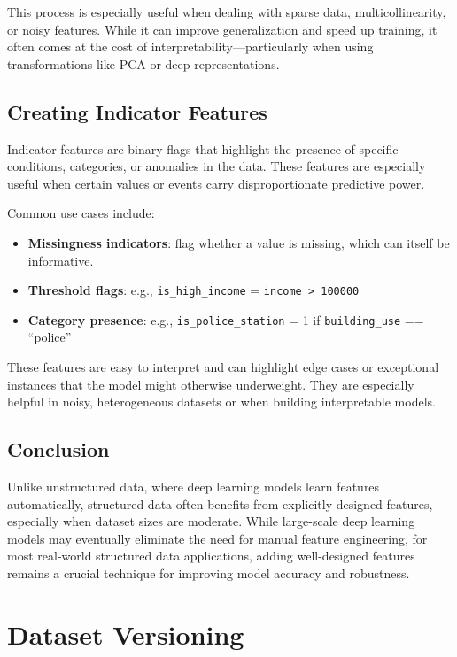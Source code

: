 \documentclass[12pt,openany]{book}
\begin{document}
This process is especially useful when dealing with sparse data, multicollinearity, or noisy features. While it can improve generalization and speed up training, it often comes at the cost of interpretability—particularly when using transformations like PCA or deep representations.



\section{Creating Indicator Features}

Indicator features are binary flags that highlight the presence of specific conditions, categories, or anomalies in the data. These features are especially useful when certain values or events carry disproportionate predictive power.

Common use cases include:
\begin{itemize}
    \item \textbf{Missingness indicators}: flag whether a value is missing, which can itself be informative.
    \item \textbf{Threshold flags}: e.g., \texttt{is\_high\_income} = \texttt{income > 100000}
    \item \textbf{Category presence}: e.g., \texttt{is\_police\_station} = 1 if \texttt{building\_use} == ``police''
\end{itemize}

These features are easy to interpret and can highlight edge cases or exceptional instances that the model might otherwise underweight. They are especially helpful in noisy, heterogeneous datasets or when building interpretable models.


\section{Conclusion}

Unlike unstructured data, where deep learning models learn features automatically, structured data often benefits from explicitly designed features, especially when dataset sizes are moderate. While large-scale deep learning models may eventually eliminate the need for manual feature engineering, for most real-world structured data applications, adding well-designed features remains a crucial technique for improving model accuracy and robustness.





\chapter{Dataset Versioning}
\end{document}

